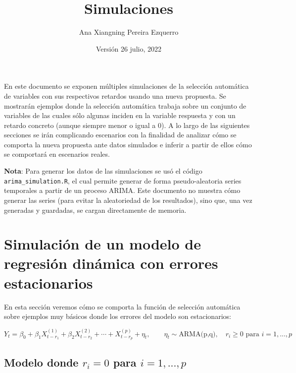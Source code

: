 \documentclass[
  12pt,
  a4paper]{article}
\title{Simulaciones}
\author{Ana Xiangning Pereira Ezquerro}
\date{Versión 26 julio, 2022}
\begin{document}
\maketitle

{
\hypersetup{linkcolor=}
\setcounter{tocdepth}{2}
\tableofcontents
}
\vspace{2em}

En este documento se exponen múltiples simulaciones de la selección
automática de variables con sus respectivos retardos usando una nueva
propuesta. Se mostrarán ejemplos donde la selección automática trabaja
sobre un conjunto de variables de las cuales sólo algunas inciden en la
variable respuesta y con un retardo concreto (aunque siempre menor o
igual a 0). A lo largo de las siguientes secciones se irán complicando
escenarios con la finalidad de analizar cómo se comporta la nueva
propuesta ante datos simulados e inferir a partir de ellos cómo se
comportará en escenarios reales.

\textbf{Nota}: Para generar los datos de las simulaciones se usó el
código \texttt{arima\_simulation.R}, el cual permite generar de forma
pseudo-aleatoria series temporales a partir de un proceso ARIMA. Este
documento no muestra cómo generar las series (para evitar la
aleatoriedad de los resultados), sino que, una vez generadas y
guardadas, se cargan directamente de memoria.

\newpage

\hypertarget{simulaciuxf3n-de-un-modelo-de-regresiuxf3n-dinuxe1mica-con-errores-estacionarios}{%
\section{Simulación de un modelo de regresión dinámica con errores
estacionarios}\label{simulaciuxf3n-de-un-modelo-de-regresiuxf3n-dinuxe1mica-con-errores-estacionarios}}

En esta sección veremos cómo se comporta la función de selección
automática sobre ejemplos muy básicos donde los errores del modelo son
estacionarios:

\[Y_t = \beta_0 + \beta_1 X_{t-r_1}^{(1)} + \beta_2 X_{t-r_2}^{(2)} + \cdots + X_{t-r_p}^{(p)}+ \eta_t, \qquad \eta_t \sim \text{ARMA(p,q)}, \quad r_i \geq 0 \text{ para } i=1,..., p \]

\hypertarget{ejemplo1}{%
\subsection{\texorpdfstring{Modelo donde \(r_i=0\) para
\(i=1,...,p\)}{Modelo donde r\_i=0 para i=1,...,p}}\label{ejemplo1}}
\end{document}
